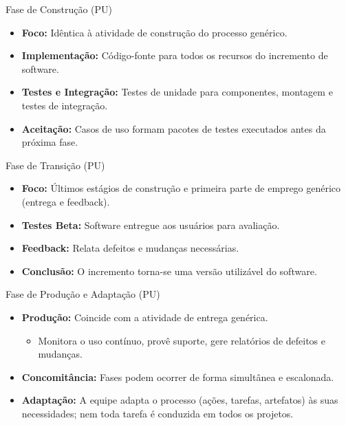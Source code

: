 \documentclass[9pt]{beamer}
\begin{document}
\begin{frame}{Fase de Construção (PU)}
  \begin{itemize}
    \item \textbf{Foco:} Idêntica à atividade de construção do processo genérico.
    \item \textbf{Implementação:} Código-fonte para todos os recursos do incremento de software.
    \item \textbf{Testes e Integração:} Testes de unidade para componentes, montagem e testes de integração.
    \item \textbf{Aceitação:} Casos de uso formam pacotes de testes executados antes da próxima fase.
  \end{itemize}
\end{frame}

\begin{frame}{Fase de Transição (PU)}
  \begin{itemize}
    \item \textbf{Foco:} Últimos estágios de construção e primeira parte de emprego genérico (entrega e feedback).
    \item \textbf{Testes Beta:} Software entregue aos usuários para avaliação.
    \item \textbf{Feedback:} Relata defeitos e mudanças necessárias.
    \item \textbf{Conclusão:} O incremento torna-se uma versão utilizável do software.
  \end{itemize}
\end{frame}

\begin{frame}{Fase de Produção e Adaptação (PU)}
  \begin{itemize}
    \item \textbf{Produção:} Coincide com a atividade de entrega genérica.
      \begin{itemize}
        \item Monitora o uso contínuo, provê suporte, gere relatórios de defeitos e mudanças.
      \end{itemize}
    \item \textbf{Concomitância:} Fases podem ocorrer de forma simultânea e escalonada.
    \item \textbf{Adaptação:} A equipe adapta o processo (ações, tarefas, artefatos) às suas necessidades; nem toda tarefa é conduzida em todos os projetos.
  \end{itemize}
\end{frame}
\end{document}
